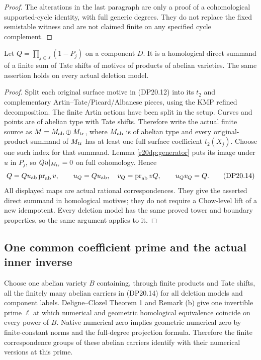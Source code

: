 \begin{proof}
The alterations in the last paragraph are only a proof of a
cohomological supported-cycle identity, with full generic
degrees. They do not replace the fixed semistable witness and
are not claimed finite on any specified cycle complement.
\end{proof}

\begin{proposition}
\label{r20dp:core}
Let $Q=\prod_{j\in J}(1-P_j)$ on a component $D$.
It is a homological direct summand of a finite sum of Tate
shifts of motives of products of abelian varieties. The same
assertion holds on every actual deletion model.
\end{proposition}

\begin{proof}
Split each original surface motive in (DP20.12) into its
$t_2$ and complementary Artin--Tate/Picard/Albanese pieces,
using the KMP refined decomposition. The finite Artin actions
have been split in the setup. Curves and points are of abelian
type with Tate shifts. Therefore write the actual finite source
as $M=M_{\rm ab}\oplus M_{\rm tr}$, where $M_{\rm ab}$ is of
abelian type and every original-product summand of $M_{\rm tr}$
has at least one full surface coefficient $t_2(X_j)$.
Choose one such index for that summand. Lemma
\ref{r20dp:generator} puts its image under $u$ in $P_j$,
so $Qu|_{M_{\rm tr}}=0$ on full cohomology. Hence
\[
 Q=Q u_{\rm ab}\operatorname{pr}_{\rm ab}v,
 \qquad
 u_Q=Q u_{\rm ab},\quad v_Q=\operatorname{pr}_{\rm ab}vQ,
 \qquad u_Qv_Q=Q.
 \tag{DP20.14}
\]
All displayed maps are actual rational correspondences. They
give the asserted direct summand in homological motives;
they do not require a Chow-level lift of a new idempotent.
Every deletion model has the same proved tower and boundary
properties, so the same argument applies to it.
\end{proof}

\subsection{One common coefficient prime and the actual inner inverse}

Choose one abelian variety $B$ containing, through finite products
and Tate shifts, all the finitely many abelian carriers in
(DP20.14) for all deletion models and component labels.
Deligne--Clozel Theorem 1 and Remark (b) give one invertible
prime $\ell$ at which numerical and geometric homological
equivalence coincide on every power of $B$. Native numerical
zero implies geometric numerical zero by finite-constant norms
and the full-degree projection formula. Therefore the finite
correspondence groups of these abelian carriers identify with
their numerical versions at this prime.

